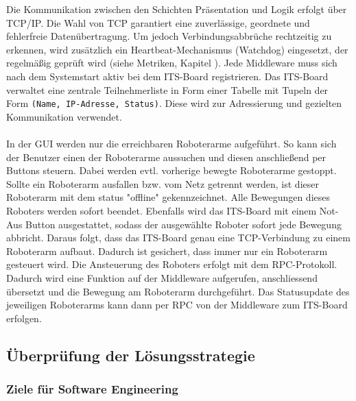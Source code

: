 Die Kommunikation zwischen den Schichten Präsentation und Logik erfolgt über TCP/IP. Die Wahl von TCP garantiert eine zuverlässige, geordnete und fehlerfreie Datenübertragung. Um jedoch Verbindungsabbrüche rechtzeitig zu erkennen, wird zusätzlich ein Heartbeat-Mechanismus (Watchdog) eingesetzt, der regelmäßig geprüft wird (siehe Metriken, Kapitel 
). Jede Middleware muss sich nach dem Systemstart aktiv bei dem ITS-Board registrieren. Das ITS-Board verwaltet eine zentrale Teilnehmerliste in Form einer Tabelle mit Tupeln der Form \texttt{(Name, IP-Adresse, Status)}. Diese wird zur Adressierung und gezielten Kommunikation verwendet. %
\\\\
In der GUI werden nur die erreichbaren Roboterarme aufgeführt. So kann sich der Benutzer einen der Roboterarme aussuchen und diesen anschließend per Buttons steuern. Dabei werden evtl. vorherige bewegte Roboterarme gestoppt. Sollte ein Roboterarm ausfallen bzw. vom Netz getrennt werden, ist dieser Roboterarm mit dem status "offline" gekennzeichnet. Alle Bewegungen dieses Roboters werden sofort beendet. Ebenfalls wird das ITS-Board mit einem Not-Aus Button ausgestattet, sodass der ausgewählte Roboter sofort jede Bewegung abbricht. Daraus folgt, dass das ITS-Board genau eine TCP-Verbindung zu einem Roboterarm aufbaut. Dadurch ist gesichert, dass immer nur ein Roboterarm gesteuert wird. Die Ansteuerung des Roboters erfolgt mit dem RPC-Protokoll. Dadurch wird eine Funktion auf der Middleware aufgerufen, anschliessend übersetzt und die Bewegung am Roboterarm durchgeführt. Das Statusupdate des jeweiligen Roboterarms kann dann per RPC von der Middleware zum ITS-Board erfolgen.


\subsection*{Überprüfung der Lösungsstrategie}
\subsubsection*{Ziele für Software Engineering}

